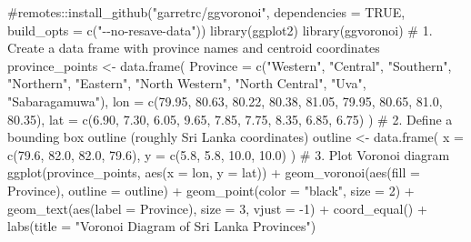 \documentclass[
  letterpaper,
  DIV=11,
  numbers=noendperiod]{scrreprt}
\newenvironment{Shaded}{\begin{snugshade}}{\end{snugshade}}
\newcommand{\AttributeTok}[1]{\textcolor[rgb]{0.40,0.45,0.13}{#1}}
\newcommand{\CommentTok}[1]{\textcolor[rgb]{0.37,0.37,0.37}{#1}}
\newcommand{\DecValTok}[1]{\textcolor[rgb]{0.68,0.00,0.00}{#1}}
\newcommand{\FloatTok}[1]{\textcolor[rgb]{0.68,0.00,0.00}{#1}}
\newcommand{\FunctionTok}[1]{\textcolor[rgb]{0.28,0.35,0.67}{#1}}
\newcommand{\NormalTok}[1]{\textcolor[rgb]{0.00,0.23,0.31}{#1}}
\newcommand{\OtherTok}[1]{\textcolor[rgb]{0.00,0.23,0.31}{#1}}
\newcommand{\SpecialCharTok}[1]{\textcolor[rgb]{0.37,0.37,0.37}{#1}}
\newcommand{\StringTok}[1]{\textcolor[rgb]{0.13,0.47,0.30}{#1}}
\begin{document}
\begin{Shaded}
\begin{Highlighting}[]
\CommentTok{\#remotes::install\_github("garretrc/ggvoronoi", dependencies = TRUE, build\_opts = c("{-}{-}no{-}resave{-}data"))}
\FunctionTok{library}\NormalTok{(ggplot2)}
\FunctionTok{library}\NormalTok{(ggvoronoi)}
\CommentTok{\# 1. Create a data frame with province names and centroid coordinates}
\NormalTok{province\_points }\OtherTok{\textless{}{-}} \FunctionTok{data.frame}\NormalTok{(}
  \AttributeTok{Province =} \FunctionTok{c}\NormalTok{(}\StringTok{"Western"}\NormalTok{, }\StringTok{"Central"}\NormalTok{, }\StringTok{"Southern"}\NormalTok{, }\StringTok{"Northern"}\NormalTok{, }
               \StringTok{"Eastern"}\NormalTok{, }\StringTok{"North Western"}\NormalTok{, }\StringTok{"North Central"}\NormalTok{, }
               \StringTok{"Uva"}\NormalTok{, }\StringTok{"Sabaragamuwa"}\NormalTok{),}
  \AttributeTok{lon =} \FunctionTok{c}\NormalTok{(}\FloatTok{79.95}\NormalTok{, }\FloatTok{80.63}\NormalTok{, }\FloatTok{80.22}\NormalTok{, }\FloatTok{80.38}\NormalTok{, }\FloatTok{81.05}\NormalTok{, }\FloatTok{79.95}\NormalTok{, }\FloatTok{80.65}\NormalTok{, }\FloatTok{81.0}\NormalTok{, }\FloatTok{80.35}\NormalTok{),}
  \AttributeTok{lat =} \FunctionTok{c}\NormalTok{(}\FloatTok{6.90}\NormalTok{, }\FloatTok{7.30}\NormalTok{, }\FloatTok{6.05}\NormalTok{, }\FloatTok{9.65}\NormalTok{, }\FloatTok{7.85}\NormalTok{, }\FloatTok{7.75}\NormalTok{, }\FloatTok{8.35}\NormalTok{, }\FloatTok{6.85}\NormalTok{, }\FloatTok{6.75}\NormalTok{)}
\NormalTok{)}
\CommentTok{\# 2. Define a bounding box outline (roughly Sri Lanka coordinates)}
\NormalTok{outline }\OtherTok{\textless{}{-}} \FunctionTok{data.frame}\NormalTok{(}
  \AttributeTok{x =} \FunctionTok{c}\NormalTok{(}\FloatTok{79.6}\NormalTok{, }\FloatTok{82.0}\NormalTok{, }\FloatTok{82.0}\NormalTok{, }\FloatTok{79.6}\NormalTok{),}
  \AttributeTok{y =} \FunctionTok{c}\NormalTok{(}\FloatTok{5.8}\NormalTok{, }\FloatTok{5.8}\NormalTok{, }\FloatTok{10.0}\NormalTok{, }\FloatTok{10.0}\NormalTok{)}
\NormalTok{)}
\CommentTok{\# 3. Plot Voronoi diagram}
\FunctionTok{ggplot}\NormalTok{(province\_points, }\FunctionTok{aes}\NormalTok{(}\AttributeTok{x =}\NormalTok{ lon, }\AttributeTok{y =}\NormalTok{ lat)) }\SpecialCharTok{+}
  \FunctionTok{geom\_voronoi}\NormalTok{(}\FunctionTok{aes}\NormalTok{(}\AttributeTok{fill =}\NormalTok{ Province), }\AttributeTok{outline =}\NormalTok{ outline) }\SpecialCharTok{+}
  \FunctionTok{geom\_point}\NormalTok{(}\AttributeTok{color =} \StringTok{"black"}\NormalTok{, }\AttributeTok{size =} \DecValTok{2}\NormalTok{) }\SpecialCharTok{+}
  \FunctionTok{geom\_text}\NormalTok{(}\FunctionTok{aes}\NormalTok{(}\AttributeTok{label =}\NormalTok{ Province), }\AttributeTok{size =} \DecValTok{3}\NormalTok{, }\AttributeTok{vjust =} \SpecialCharTok{{-}}\DecValTok{1}\NormalTok{) }\SpecialCharTok{+}
  \FunctionTok{coord\_equal}\NormalTok{() }\SpecialCharTok{+}
  \FunctionTok{labs}\NormalTok{(}\AttributeTok{title =} \StringTok{"Voronoi Diagram of Sri Lanka Provinces"}\NormalTok{) }
\end{Highlighting}
\end{Shaded}
\end{document}
